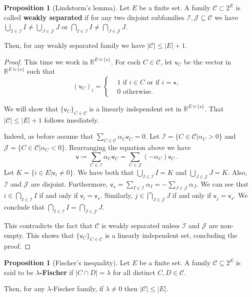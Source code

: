 \documentclass[12pt]{amsart}
\theoremstyle{definition}
\newtheorem{prop}[thm]{Proposition}
\newcommand{\R}{\mathbb{R}}
\newcommand{\CC}{\mathcal C}
\newcommand{\JJ}{\mathcal J}
\newcommand{\II}{\mathcal I}
\newcommand{\vv}{\mathsf{v}}
\begin{document}
\begin{prop}[Lindstorm's lemma]
Let $E$ be a finite set.
A family $\CC \subset 2^E $ is called \textbf{weakly separated} if for any two disjoint subfamilies $\II, \JJ \subseteq \CC$ we have $\bigcup_{I\in\II} I \neq \bigcup_{J\in\JJ} J$ or $\bigcap_{I\in\II} I \neq \bigcap_{J\in\JJ} J$.

Then, for any weakly separated family we have $|\CC| \leq |E| + 1$.
\end{prop}

\begin{proof}
This time we work in $\R^{E \uplus \{ \star \}}$.
For each $C \in \CC$, let $\vv_C$ be the vector in $\R^{E \uplus \{ \star \}}$ such that 
$$ (\vv_C)_i =\begin{cases*}
      & 1 \text{ if $i \in C$ or if $i = \star$,}\\
      & 0 \text{ otherwise.}
    \end{cases*} $$


We will show that $\{ \vv_C\}_{C\in \CC}$ is a linearly independent set in $\R^{E \uplus \{ \star \}}$.
That $|\CC| \leq |E|+1$ follows imediately.

Indeed, as before assume that $\sum_{C \in \CC} \alpha_C \vv_C = 0$.
Let $\II = \{C \in \CC | \alpha_C > 0\}$ and $\JJ = \{C \in \CC | \alpha_C < 0\}$.
Rearranging the equation above we have
$$\vv \coloneqq \sum_{C \in \II} \alpha_C \vv_C  = \sum_{C \in \JJ} (- \alpha_C) \vv_C\, .$$
Let $K = \{i \in E| \vv_i \neq 0\}$.
We have both that $\bigcup_{I\in\II} I = K$ and $\bigcup_{J\in\JJ} J = K$.
Also, $\II$ and $\JJ$ are disjoint.
Furthermore, $\vv_{\star } = \sum_{I \in \II} \alpha_I = - \sum_{J \in \JJ} \alpha_J$.
We can see that $i \in \bigcap_{I \in \II} I$ if and only if $\vv_i = \vv_{\star }$.
Similarly, $j \in \bigcap_{J \in \JJ} J$ if and only if $\vv_j = \vv_{\star }$.
We conclude that $\bigcap_{I \in \II} I = \bigcap_{J \in \JJ} J$.

This contradicts the fact that $\CC$ is weakly separated unless $\II$ and $\JJ$ are non-empty.
This shows that $ \{ \vv_C\}_{C\in \CC}$ is a linearly independent set, concluding the proof.
\end{proof}


\begin{prop}[Fischer's inequality]\label{prop:fischer}
Let $E$ be a finite set.
A family $\CC \subseteq 2^E$ is said to be $\lambda$\textbf{-Fischer} if $|C\cap D| = \lambda$ for all distinct $C, D \in \CC$.

Then, for any $\lambda$-Fischer family, if $\lambda \neq 0$ then $|\CC| \leq |E|$.
\end{prop}
\end{document}
